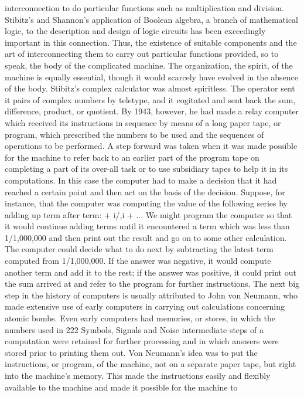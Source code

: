 {{{{{{{{{{{interconnection to do particular functions such as multiplication
and division. Stibitz’s and Shannon’s application of Boolean algebra,
a branch of mathematical logic, to the description and design
of logic circuits has been exceedingly important in this connection.
Thus, the existence of suitable components and the art of interconnecting
them to carry out particular functions provided, so to
speak, the body of the complicated machine. The organization, the
spirit, of the machine is equally essential, though it would scarcely
have evolved in the absence of the body.
Stibitz’s complex calculator was almost spiritless. The operator
sent it pairs of complex numbers by teletype, and it cogitated and
sent back the sum, difference, product, or quotient. By 1943,
however, he had made a relay computer which received its instructions
in sequence by means of a long paper tape, or program, which
prescribed the numbers to be used and the sequences of operations
to be performed.
A step forward was taken when it was made possible for the
machine to refer back to an earlier part of the program tape on
completing a part of its over-all task or to use subsidiary tapes to
help it in its computations. In this case the computer had to make
a decision that it had reached a certain point and then act on the
basis of the decision. Suppose, for instance, that the computer was
computing the value of the following series by adding up term
after term:
+ i/,i + ...
We might program the computer so that it would continue adding
terms until it encountered a term which was less than 1/1,000,000
and then print out the result and go on to some other calculation.
The computer could decide what to do next by subtracting the
latest term computed from 1/1,000,000. If the answer was negative,
it would compute another term and add it to the rest; if the
answer was positive, it could print out the sum arrived at and refer
to the program for further instructions.
The next big step in the history of computers is usually attributed
to John von Neumann, who made extensive use of early computers
in carrying out calculations concerning atomic bombs. Even early
computers had memories, or stores, in which the numbers used in
222
Symbols, Signals and Noise
intermediate steps of a computation were retained for further
processing and in which answers were stored prior to printing them
out. Von Neumann’s idea was to put the instructions, or program,
of the machine, not on a separate paper tape, but right into the
machine’s memory. This made the instructions easily and flexibly
available to the machine and made it possible for the machine to
}}}}}}}}}}}
